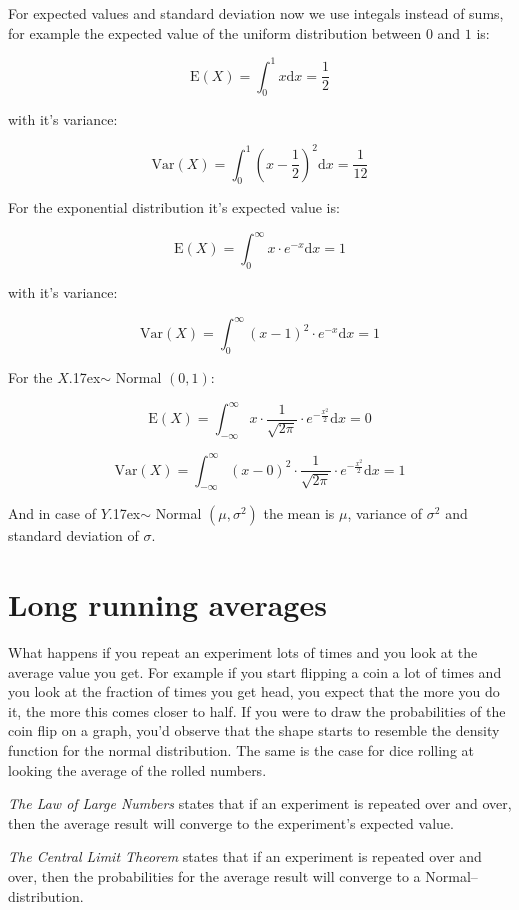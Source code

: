 For expected values and standard deviation now we use integals instead of sums,
for example the expected value of the uniform distribution between $0$ and $1$
is:

\[ \mbox{E}(X) = \int_{0}^{1}x\mbox{d}x = \frac{1}{2}  \]

with it's variance:

\[ \mbox{Var}(X) = \int_{0}^{1}\left(x - \frac{1}{2}\right)^2\mbox{d}x =
	\frac{1}{12}
\]

For the exponential distribution it's expected value is:

\[ \mbox{E}(X) = \int_{0}^{\infty}x\cdot e^{-x}\mbox{d}x = 1  \]

with it's variance:

\[ \mbox{Var}(X) = \int_{0}^{\infty}\left(x - 1\right)^2\cdot e^{-x}\mbox{d}x =
	1 \]

For the $X ${\raise.17ex\hbox{$\scriptstyle\mathtt{\sim}$}} Normal $(0,1)$:

\[ \mbox{E}(X)  = \int_{-\infty}^{\infty}x \cdot \frac{1}{\sqrt{2\pi}}
	\cdot e^{-\frac{x^2}{2}} \mbox{d}x = 0
\]

\[ \mbox{Var}(X)  = \int_{-\infty}^{\infty} \left(x - 0\right)^2 \cdot
	\frac{1}{\sqrt{2\pi}} \cdot e^{-\frac{x^2}{2}}\mbox{d}x = 1
\]

And in case of $Y ${\raise.17ex\hbox{$\scriptstyle\mathtt{\sim}$}} Normal
$(\mu,\sigma^2)$ the mean is $\mu$, variance of $\sigma^2$ and standard
deviation of $\sigma$.

\section{Long running averages}

What happens if you repeat an experiment lots of times and you look at the
average value you get. For example if you start flipping a coin a lot of times
and you look at the fraction of times you get head, you expect that the more you
do it, the more this comes closer to half. If you were to draw the probabilities
of the coin flip on a graph, you'd observe that the shape starts to resemble the
density function for the normal distribution. The same is the case for dice
rolling at looking the average of the rolled numbers.

\emph{The Law of Large Numbers} states that if an experiment is repeated over
and over, then the average result will converge to the experiment's expected value.

\emph{The Central Limit Theorem} states that if an experiment is repeated over
and over, then the probabilities for the average result will converge to a
Normal--distribution.

